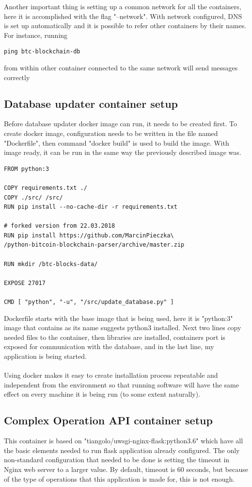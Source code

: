 \documentclass[12pt, en, eng, oneside, final]{mgr}
\begin{document}
Another important thing is setting up a common network for all the containers, here it is accomplished with the flag "--network". With network configured, DNS is set up automatically and it is possible to refer other containers by their names. For instance, running 
\begin{verbatim}
ping btc-blockchain-db
\end{verbatim}  
from within other container connected to the same network will send messages correctly

\subsection{Database updater container setup}
Before database updater docker image can run, it needs to be created first. To create docker image, configuration needs to be written in the file named "Dockerfile", then command "docker build" is used to build the image. With image ready, it can be run in the same way the previously described image was.

\begin{lstlisting}[caption=The dockerfile for database updater]
FROM python:3

COPY requirements.txt ./
COPY ./src/ /src/
RUN pip install --no-cache-dir -r requirements.txt

# forked version from 22.03.2018
RUN pip install https://github.com/MarcinPieczka\
/python-bitcoin-blockchain-parser/archive/master.zip

RUN mkdir /btc-blocks-data/

EXPOSE 27017

CMD [ "python", "-u", "/src/update_database.py" ]
\end{lstlisting}

Dockerfile starts with the base image that is being used, here it is "python:3" \cite{python3} image that contains as its name suggests python3 installed.
Next two lines copy needed files to the container, then libraries are installed, containers port is exposed for communication with the database, and in the last line, my application is being started.
\\
\\
Using docker makes it easy to create installation process repeatable and independent from the environment so that running software will have the same effect on every machine it is being run (to some extent naturally). 

\subsection{Complex Operation API container setup}
This container is based on "tiangolo/uwsgi-nginx-flask:python3.6" \cite{flask} which have all the basic elements needed to run flask application already configured. The only non-standard configuration that needed to be done is setting the timeout in Nginx \cite{nginx} web server to a larger value. By default, timeout is 60 seconds, but because of the type of operations that this application is made for, this is not enough.  
\end{document}

